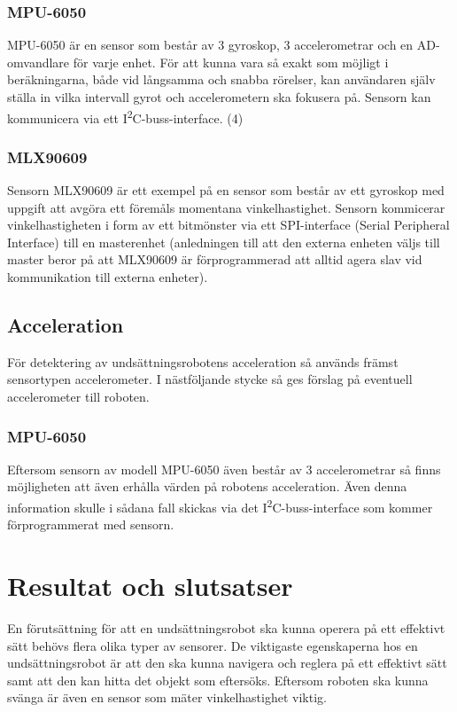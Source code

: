 \documentclass[11pt]{article}
\begin{document}
\begin{flushleft}
\subsubsection{MPU-6050}
MPU-6050 är en sensor som består av 3 gyroskop, 3 accelerometrar och en AD-omvandlare för varje enhet. För att kunna vara så exakt som möjligt i beräkningarna, både vid långsamma och snabba rörelser, kan användaren själv ställa in vilka intervall gyrot och accelerometern ska fokusera på. Sensorn kan kommunicera via ett I\textsuperscript{2}C-buss-interface. (4)

\subsubsection{MLX90609}
Sensorn MLX90609 är ett exempel på en sensor som består av ett gyroskop med uppgift att avgöra ett föremåls momentana vinkelhastighet. Sensorn kommicerar vinkelhastigheten i form av ett bitmönster via ett SPI-interface (Serial Peripheral Interface) till en masterenhet (anledningen till att den externa enheten väljs till master beror på att MLX90609 är förprogrammerad att alltid agera slav vid kommunikation till externa enheter). \cite{Melexis}

\subsection{Acceleration}
För detektering av undsättningsrobotens acceleration så används främst sensortypen accelerometer. I nästföljande stycke så ges förslag på eventuell accelerometer till roboten.

\subsubsection{MPU-6050}
Eftersom sensorn av modell MPU-6050 även består av 3 accelerometrar så finns möjligheten att även erhålla värden på robotens acceleration. Även denna information skulle i sådana fall skickas via det I\textsuperscript{2}C-buss-interface som kommer förprogrammerat med sensorn.


\pagebreak
\section{Resultat och slutsatser}
En förutsättning för att en undsättningsrobot ska kunna operera på ett effektivt sätt behövs flera olika typer av sensorer. De viktigaste egenskaperna hos en undsättningsrobot är att den ska kunna navigera och reglera på ett effektivt sätt samt att den kan hitta det objekt som eftersöks. Eftersom roboten ska kunna svänga är även en sensor som mäter vinkelhastighet viktig.


\end{flushleft}
\end{document}
